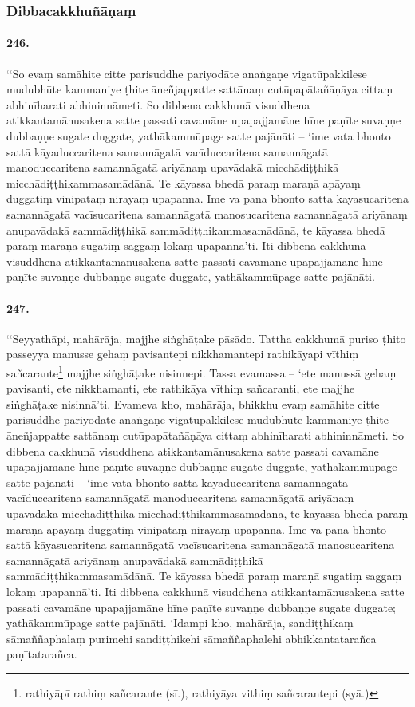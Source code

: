 \subsubsection{Dibbacakkhuñāṇaṃ}

\paragraph{246.} ‘‘So evaṃ samāhite citte parisuddhe pariyodāte anaṅgaṇe vigatūpakkilese mudubhūte kammaniye ṭhite āneñjappatte sattānaṃ cutūpapātañāṇāya cittaṃ abhinīharati abhininnāmeti. So dibbena cakkhunā visuddhena atikkantamānusakena satte passati cavamāne upapajjamāne hīne paṇīte suvaṇṇe dubbaṇṇe sugate duggate, yathākammūpage satte pajānāti – ‘ime vata bhonto sattā kāyaduccaritena samannāgatā vacīduccaritena samannāgatā manoduccaritena samannāgatā ariyānaṃ upavādakā micchādiṭṭhikā micchādiṭṭhikammasamādānā. Te kāyassa bhedā paraṃ maraṇā apāyaṃ duggatiṃ vinipātaṃ nirayaṃ upapannā. Ime vā pana bhonto sattā kāyasucaritena samannāgatā vacīsucaritena samannāgatā manosucaritena samannāgatā ariyānaṃ anupavādakā sammādiṭṭhikā sammādiṭṭhikammasamādānā, te kāyassa bhedā paraṃ maraṇā sugatiṃ saggaṃ lokaṃ upapannā’ti. Iti dibbena cakkhunā visuddhena atikkantamānusakena satte passati cavamāne upapajjamāne hīne paṇīte suvaṇṇe dubbaṇṇe sugate duggate, yathākammūpage satte pajānāti.

\paragraph{247.} ‘‘Seyyathāpi, mahārāja, majjhe siṅghāṭake pāsādo. Tattha cakkhumā puriso ṭhito passeyya manusse gehaṃ pavisantepi nikkhamantepi rathikāyapi vīthiṃ sañcarante\footnote{rathiyāpī rathiṃ sañcarante (sī.), rathiyāya vithiṃ sañcarantepi (syā.)} majjhe siṅghāṭake nisinnepi. Tassa evamassa – ‘ete manussā gehaṃ pavisanti, ete nikkhamanti, ete rathikāya vīthiṃ sañcaranti, ete majjhe siṅghāṭake nisinnā’ti. Evameva kho, mahārāja, bhikkhu evaṃ samāhite citte parisuddhe pariyodāte anaṅgaṇe vigatūpakkilese mudubhūte kammaniye ṭhite āneñjappatte sattānaṃ cutūpapātañāṇāya cittaṃ abhinīharati abhininnāmeti. So dibbena cakkhunā visuddhena atikkantamānusakena satte passati cavamāne upapajjamāne hīne paṇīte suvaṇṇe dubbaṇṇe sugate duggate, yathākammūpage satte pajānāti – ‘ime vata bhonto sattā kāyaduccaritena samannāgatā vacīduccaritena samannāgatā manoduccaritena samannāgatā ariyānaṃ upavādakā micchādiṭṭhikā micchādiṭṭhikammasamādānā, te kāyassa bhedā paraṃ maraṇā apāyaṃ duggatiṃ vinipātaṃ nirayaṃ upapannā. Ime vā pana bhonto sattā kāyasucaritena samannāgatā vacīsucaritena samannāgatā manosucaritena samannāgatā ariyānaṃ anupavādakā sammādiṭṭhikā sammādiṭṭhikammasamādānā. Te kāyassa bhedā paraṃ maraṇā sugatiṃ saggaṃ lokaṃ upapannā’ti. Iti dibbena cakkhunā visuddhena atikkantamānusakena satte passati cavamāne upapajjamāne hīne paṇīte suvaṇṇe dubbaṇṇe sugate duggate; yathākammūpage satte pajānāti. ‘Idampi kho, mahārāja, sandiṭṭhikaṃ sāmaññaphalaṃ purimehi sandiṭṭhikehi sāmaññaphalehi abhikkantatarañca paṇītatarañca.

